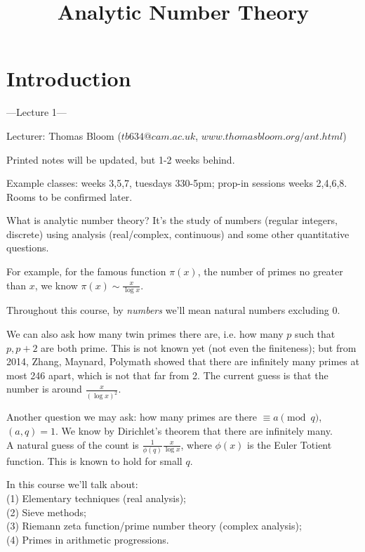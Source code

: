 \documentclass[a4paper]{article}
\begin{document}
\title{Analytic Number Theory}

\maketitle

\newpage

\tableofcontents

\newpage

\section{Introduction}

---Lecture 1---

Lecturer: Thomas Bloom ($tb634@cam.ac.uk$, $www.thomasbloom.org/ant.html$)

Printed notes will be updated, but 1-2 weeks behind.

Example classes: weeks 3,5,7, tuesdays 330-5pm; prop-in sessions weeks 2,4,6,8. Rooms to be confirmed later.

What is analytic number theory? It's the study of numbers (regular integers, discrete) using analysis (real/complex, continuous) and some other quantitative questions.

For example, for the famous function $\pi(x)$, the number of primes no greater than $x$, we know $\pi(x) \sim \frac{x}{\log x}$.

Throughout this course, by \emph{numbers} we'll mean natural numbers excluding 0.

We can also ask how many twin primes there are, i.e. how many $p$ such that $p,p+2$ are both prime. This is not known yet (not even the finiteness); but from 2014, Zhang, Maynard, Polymath showed that there are infinitely many primes at most 246 apart, which is not that far from 2. The current guess is that the number is around $\frac{x}{(\log x)^2}$.

Another question we may ask: how many primes are there $\equiv a \pmod q$, $(a,q) = 1$. We know by Dirichlet's theorem that there are infinitely many.\\
A natural guess of the count is $\frac{1}{\phi(q)} \frac{x}{\log x}$, where $\phi(x)$ is the Euler Totient function. This is known to hold for small $q$.

In this course we'll talk about:\\
(1) Elementary techniques (real analysis);\\
(2) Sieve methods;\\
(3) Riemann zeta function/prime number theory (complex analysis);\\
(4) Primes in arithmetic progressions.
\end{document}
